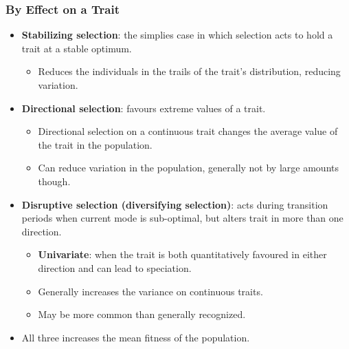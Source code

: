 \documentclass[12pt,a4paper]{article}
\begin{document}
\begin{itemize}
    \subsubsection{By Effect on a Trait}
    \begin{itemize}
        \item \textbf{Stabilizing selection}: the simplies case in which selection acts to hold a trait at a stable optimum.
            \begin{itemize}
                \item Reduces the individuals in the trails of the trait's distribution, reducing variation.
            \end{itemize}
        \item \textbf{Directional selection}: favours extreme values of a trait.
            \begin{itemize}
                \item Directional selection on a continuous trait changes the average value of the trait in the population.
                \item Can reduce variation in the population, generally not by large amounts though.
            \end{itemize}
        \item \textbf{Disruptive selection (diversifying selection)}: acts during transition periods when current mode is sub-optimal, but alters trait in more than one direction.
            \begin{itemize}
                \item \textbf{Univariate}: when the trait is both quantitatively favoured in either direction and can lead to speciation.
                \item Generally {\color{o-Sun}increases the variance} on continuous traits. 
                \item May be more common than generally recognized.
            \end{itemize}
        \item All three increases the mean fitness of the population.
    \end{itemize}

\end{itemize}
\end{document}
